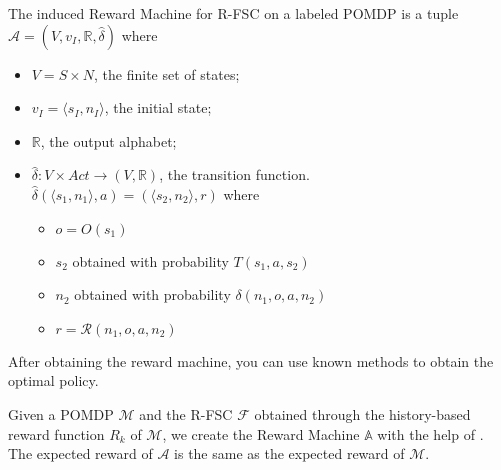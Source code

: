 \begin{definition}
	\label{def:reward_machine}
	The induced Reward Machine for R-FSC on a labeled POMDP is a tuple $\mathcal{A}=(V,v_I,\mathbb{R},\hat{\delta})$ where 
	\begin{itemize}
		\item $V=S\times N$, the finite set of states;
		\item $v_I=\langle s_I,n_I\rangle $, the initial state;
		\item $\mathbb{R}$, the output alphabet;
		\item $\hat{\delta}:V\times Act \to (V,\mathbb{R})$, the transition function.\\
		$ \hat{\delta}(\langle s_1,n_1\rangle,a) = (\langle s_2,n_2\rangle,r) $ where 
		\begin{itemize}
			\item $o=O(s_1)$
			\item $s_2$ obtained with probability $T(s_1,a,s_2)$
			\item $n_2$ obtained with probability $\delta(n_1,o,a,n_2)$
			\item $r= \mathcal{R}(n_1,o,a,n_2)$
		\end{itemize}
	\end{itemize}
\end{definition}


After obtaining the reward machine, you can use known methods to obtain the optimal policy. 

\begin{corollary}
	Given a POMDP $\mathcal{M}$ and the R-FSC $\mathcal{F}$ obtained through the history-based reward function $R_k$ of $\mathcal{M}$, we create the Reward Machine $\mathbb{A}$ with the help of . The expected reward of $\mathcal{A}$ is the same as the expected reward of $\mathcal{M}$. 
\end{corollary}